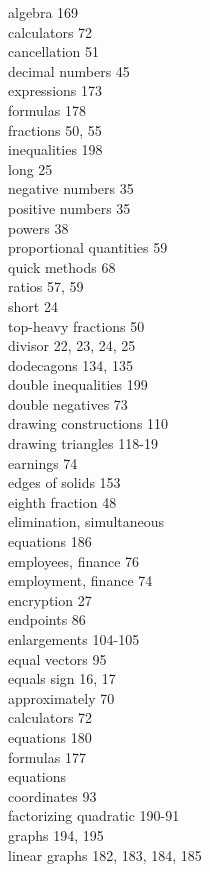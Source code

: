 \documentclass[10pt]{article}
\begin{document}
algebra 169\\
calculators 72\\
cancellation 51\\
decimal numbers 45\\
expressions 173\\
formulas 178\\
fractions 50, 55\\
inequalities 198\\
long 25\\
negative numbers 35\\
positive numbers 35\\
powers 38\\
proportional quantities 59\\
quick methods 68\\
ratios 57, 59\\
short 24\\
top-heavy fractions 50\\
divisor 22, 23, 24, 25\\
dodecagons 134, 135\\
double inequalities 199\\
double negatives 73\\
drawing constructions 110\\
drawing triangles 118-19\\
earnings 74\\
edges of solids 153\\
eighth fraction 48\\
elimination, simultaneous\\
equations 186\\
employees, finance 76\\
employment, finance 74\\
encryption 27\\
endpoints 86\\
enlargements 104-105\\
equal vectors 95\\
equals sign 16, 17\\
approximately 70\\
calculators 72\\
equations 180\\
formulas 177\\
equations\\
coordinates 93\\
factorizing quadratic 190-91\\
graphs 194, 195\\
linear graphs 182, 183, 184, 185\\
\end{document}
